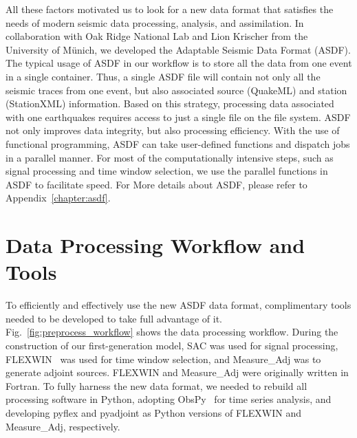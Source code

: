All these factors motivated us to
look for a new data format that satisfies the needs of modern seismic data processing, analysis, and assimilation.
In collaboration with Oak Ridge National Lab and Lion Krischer from the University of M\"unich, we developed the Adaptable Seismic Data Format (ASDF).
The typical usage of ASDF in our workflow is to store all the data from one
event in a single container.
Thus, a single ASDF file will contain not only all the seismic traces from one
event, but also associated source (QuakeML) and station (StationXML) information.
Based on this strategy,
processing data associated with one earthquakes requires access to just a single file on the file system.
ASDF not only improves data integrity, but also processing efficiency.
With the use of functional programming, ASDF can take user-defined functions and dispatch jobs in a parallel manner.
For most of the computationally intensive steps, such as signal
processing and time window selection, we use the parallel functions in ASDF
to facilitate speed.
For More details about ASDF, please refer to Appendix~\ref{chapter:asdf}.

\section{Data Processing Workflow and Tools}
\label{section:data_processing}

To efficiently and effectively use the new ASDF data format,
complimentary tools needed to be developed to take full advantage of it.
Fig.~\ref{fig:preprocess_workflow} shows the data processing workflow.
During the construction of our first-generation model,
SAC was used for signal processing,
FLEXWIN~\cite{maggi2009automated} was used for time window selection,
and Measure\_Adj was to generate adjoint sources.
FLEXWIN and Measure\_Adj were originally written in Fortran.
To fully harness the new data format,
we needed to rebuild all processing software in Python,
adopting ObsPy~\cite{obspy2010} for time series analysis,
and developing pyflex and pyadjoint as Python versions of FLEXWIN and Measure\_Adj,
respectively.


